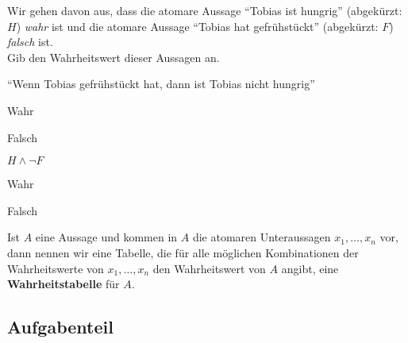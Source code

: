 \documentclass{uebungsblatt}
\begin{document}
\begin{exercise}

    Wir gehen davon aus, dass die atomare Aussage \enquote{Tobias ist hungrig} (abgekürzt: $H$)
    \emph{wahr} ist und die atomare Aussage \enquote{Tobias hat gefrühstückt} (abgekürzt: $F$)
    \emph{falsch} ist.
    \\

    Gib den Wahrheitswert dieser Aussagen an.
    
    \begin{center}
    \enquote{Wenn Tobias gefrühstückt hat, dann ist Tobias nicht hungrig}
    \end{center}

    
    \begin{multicols}{2}
        \begin{multiplechoice}
            \citem Wahr
            \item Falsch
        \end{multiplechoice}
    \end{multicols}

    \begin{center}
        $H \land \lnot F$
    \end{center}
    
        
        \begin{multicols}{2}
            \begin{multiplechoice}
                \citem Wahr
                \item Falsch
            \end{multiplechoice}
        \end{multicols}

\end{exercise}

\newpage


\begin{definition}
    Ist $A$ eine Aussage und kommen in $A$ die atomaren Unteraussagen $x_1,\dots,x_n$ vor, dann nennen wir eine Tabelle, die für alle möglichen Kombinationen der Wahrheitswerte von $x_1,\dots,x_n$ den Wahrheitswert von $A$ angibt, eine \textbf{Wahrheitstabelle} für $A$.
\end{definition}

\subsection*{Aufgabenteil}
\end{document}
